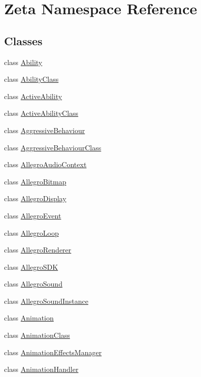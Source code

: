\hypertarget{namespaceZeta}{\section{Zeta Namespace Reference}
\label{namespaceZeta}
}
\subsection*{Classes}
\begin{DoxyCompactItemize}
\item 
class \hyperlink{classZeta_1_1Ability}{Ability}
\item 
class \hyperlink{classZeta_1_1AbilityClass}{Ability\+Class}
\item 
class \hyperlink{classZeta_1_1ActiveAbility}{Active\+Ability}
\item 
class \hyperlink{classZeta_1_1ActiveAbilityClass}{Active\+Ability\+Class}
\item 
class \hyperlink{classZeta_1_1AggressiveBehaviour}{Aggressive\+Behaviour}
\item 
class \hyperlink{classZeta_1_1AggressiveBehaviourClass}{Aggressive\+Behaviour\+Class}
\item 
class \hyperlink{classZeta_1_1AllegroAudioContext}{Allegro\+Audio\+Context}
\item 
class \hyperlink{classZeta_1_1AllegroBitmap}{Allegro\+Bitmap}
\item 
class \hyperlink{classZeta_1_1AllegroDisplay}{Allegro\+Display}
\item 
class \hyperlink{classZeta_1_1AllegroEvent}{Allegro\+Event}
\item 
class \hyperlink{classZeta_1_1AllegroLoop}{Allegro\+Loop}
\item 
class \hyperlink{classZeta_1_1AllegroRenderer}{Allegro\+Renderer}
\item 
class \hyperlink{classZeta_1_1AllegroSDK}{Allegro\+S\+D\+K}
\item 
class \hyperlink{classZeta_1_1AllegroSound}{Allegro\+Sound}
\item 
class \hyperlink{classZeta_1_1AllegroSoundInstance}{Allegro\+Sound\+Instance}
\item 
class \hyperlink{classZeta_1_1Animation}{Animation}
\item 
class \hyperlink{classZeta_1_1AnimationClass}{Animation\+Class}
\item 
class \hyperlink{classZeta_1_1AnimationEffectsManager}{Animation\+Effects\+Manager}
\item 
class \hyperlink{classZeta_1_1AnimationHandler}{Animation\+Handler}

\end{DoxyCompactItemize}
